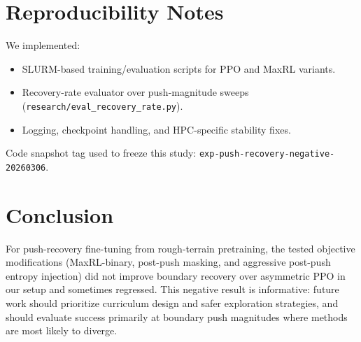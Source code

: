 \documentclass[letterpaper, 10 pt, conference]{ieeeconf}
\begin{document}
\section{Reproducibility Notes}
We implemented:
\begin{itemize}
  \item SLURM-based training/evaluation scripts for PPO and MaxRL variants.
  \item Recovery-rate evaluator over push-magnitude sweeps (\texttt{research/eval\_recovery\_rate.py}).
  \item Logging, checkpoint handling, and HPC-specific stability fixes.
\end{itemize}

Code snapshot tag used to freeze this study:
\texttt{exp-push-recovery-negative-20260306}.

\section{Conclusion}
For push-recovery fine-tuning from rough-terrain pretraining, the tested objective modifications (MaxRL-binary, post-push masking, and aggressive post-push entropy injection) did not improve boundary recovery over asymmetric PPO in our setup and sometimes regressed. This negative result is informative: future work should prioritize curriculum design and safer exploration strategies, and should evaluate success primarily at boundary push magnitudes where methods are most likely to diverge.



\end{document}
